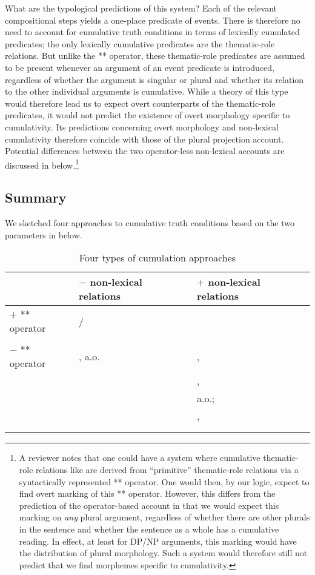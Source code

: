 \documentclass[output=paper]{langscibook}
\begin{document}
What are the typological predictions of this system? Each of the relevant compositional steps yields a one-place predicate of events. There is therefore no need to account for cumulative truth conditions in terms of lexically cumulated predicates; the only lexically cumulative predicates are the thematic-role relations. But unlike the ** operator, these thematic-role predicates are assumed to be present whenever an argument of an event predicate is introduced, regardless of whether the argument is singular or plural and whether its relation to the other individual arguments is cumulative. While a theory of this type would therefore lead us to expect overt counterparts of the thematic-role predicates, it would not predict the existence of overt morphology specific to cumulativity. Its predictions concerning overt morphology and non-lexical cumulativity therefore coincide with those of the plural projection account. Potential differences between the two operator-less non-lexical accounts are discussed in  below.\footnote{A reviewer notes that one could have a system where cumulative thematic-role relations like  are derived from ``primitive'' thematic-role relations via a syntactically represented ** operator. One would then, by our logic, expect to find overt marking of this ** operator. However, this differs from the prediction of the operator-based account in that we would expect this marking on \textit{any} plural argument, regardless of whether there are other plurals in the sentence and whether the sentence as a whole has a cumulative reading. In effect, at least for DP/NP arguments, this marking would have the distribution of plural morphology. Such a system would therefore still not predict that we find morphemes specific to cumulativity.}

\subsection{Summary}

We sketched four approaches to cumulative truth conditions based on the two parameters in  below.

\begin{table}[h!]
\caption{Four types of cumulation approaches}
\label{has-sch:table}
\centering
\begin{tabularx}{\textwidth}{lXX}  
  \lsptoprule
  & $-$ non-lexical relations & $+$ non-lexical relations \\  \midrule
 $+$ ** operator & / & \citet{Sternefeld:1998}\\ 
 & & \citet{Beck:2000a}\\\tablevspace
 $-$ ** operator & \citet{Scha:1981}, \citet{Krifka:1986} a.o. 
 & \citet{Landman:1996,Landman:2000}, \\
 & & \citet{Schein:1993},\\
 & & \citet{Kratzer:2003,Kratzer:2008} a.o.;\\
 & & \citet{Schmitt:2019}, \\
 & & \citet{Haslinger:2018a} \\
  \lspbottomrule
\end{tabularx}
\end{table}
\end{document}
